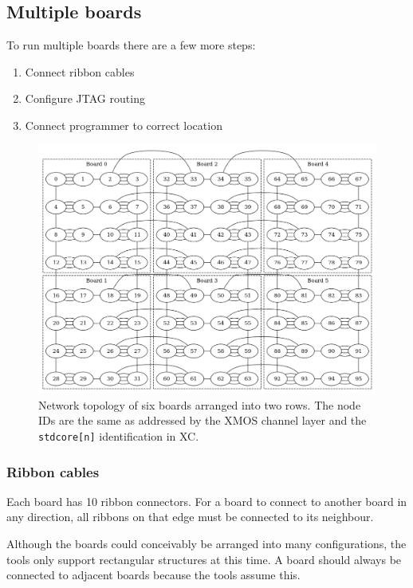 \documentclass[12pt,a4paper,final,twoside]{article}
\begin{document}
\subsection{Multiple boards}

To run multiple boards there are a few more steps:

\begin{enumerate}
\item Connect ribbon cables
\item Configure JTAG routing
\item Connect programmer to correct location
\end{enumerate}

\begin{figure}[htb]
\centering
\includegraphics[scale=0.5]{xmp16-3x2-fixed.png}
\caption{Network topology of six boards arranged into two rows. The node IDs are the same as addressed by the XMOS channel layer and the \texttt{stdcore[n]} identification in XC.}
\end{figure}

\subsubsection{Ribbon cables}

Each board has 10 ribbon connectors. For a board to connect to another board in any direction, all ribbons on that edge must be connected to its neighbour.

Although the boards could conceivably be arranged into many configurations, the tools only support rectangular structures at this time. A board should always be connected to adjacent boards because the tools assume this.
\end{document}
